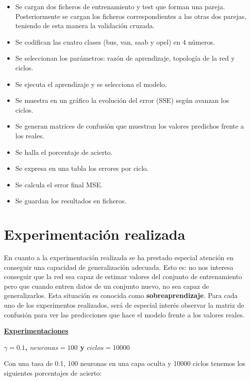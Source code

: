 \documentclass[11pt,spanish,listoffigures,listoftables]{workluis}
\begin{document}
\begin{itemize}
\item Se cargan dos ficheros de entrenamiento y test que forman una pareja. Posteriormente se cargan los ficheros correspondientes a las otras dos parejas, teniendo de esta manera la validación cruzada.
\item Se codifican las cuatro clases (bus, van, saab y opel) en 4 números.
\item Se seleccionan los parámetros: razón de aprendizaje, topología de la red y ciclos.
\item Se ejecuta el aprendizaje y se selecciona el modelo.
\item Se muestra en un gráfico la evolución del error (SSE) según avanzan los ciclos.
\item Se generan matrices de confusión que muestran los valores predichos frente a los reales.
\item Se halla el porcentaje de acierto.
\item Se expresa en una tabla los errores por ciclo.
\item Se calcula el error final MSE.
\item Se guardan los resultados en ficheros.
\end{itemize}

\section{Experimentación realizada}

\par En cuanto a la experimentación realizada se ha prestado especial atención en conseguir una capacidad de generalización adecuada. Esto es: no nos interesa conseguir que la red sea capaz de estimar valores del conjunto de entrenamiento pero que cuando entren datos de un conjunto nuevo, no sea capaz de generalizarlos. Esta situación es conocida como \textbf{sobreaprendizaje}. Para cada uno de los experimentos realizados, será de especial interés observar la matriz de confusión para ver las predicciones que hace el modelo frente a los valores reales.

\par \underline{\textbf{Experimentaciones}}

\par \textbf{$\gamma = 0.1$, $neuronas = 100$ y $ciclos = 10000$}

\par Con una tasa de 0.1, 100 neuronas en una capa oculta y 10000 ciclos tenemos los siguientes porcentajes de acierto:
\end{document}
